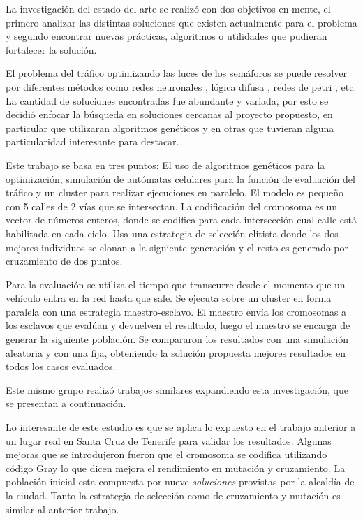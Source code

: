 La investigación del estado del arte se realizó con dos objetivos en mente, el primero analizar las distintas soluciones que existen actualmente para el problema y segundo encontrar nuevas prácticas, algoritmos o utilidades que pudieran fortalecer la solución.

El problema del tráfico optimizando las luces de los semáforos se puede resolver por diferentes métodos como  redes neuronales \citep{Lopez1999}, lógica difusa \citep{Lim2001}, redes de petri \citep{DiFebbraro2002}, etc. La cantidad de soluciones encontradas fue abundante y variada, por esto se decidió enfocar la búsqueda en soluciones cercanas al proyecto propuesto, en particular que utilizaran algoritmos genéticos y en otras que tuvieran alguna particularidad interesante para destacar.


\begin{itemize}
\begin{item}

Este trabajo se basa en tres puntos: El uso de algoritmos genéticos para la optimización, simulación de autómatas celulares para la función de evaluación del tráfico y un cluster para realizar ejecuciones en paralelo.
El modelo es pequeño con 5 calles de 2 vías que se intersectan.
La codificación del cromosoma es un vector de números enteros, donde se codifica para cada intersección cual calle está habilitada en cada ciclo.
Usa una estrategia de selección elitista donde los dos mejores individuos se clonan a la siguiente generación y el resto es generado por cruzamiento de dos puntos.

Para la evaluación se utiliza el tiempo que transcurre desde el momento que un vehículo entra en la red hasta que sale. Se ejecuta sobre un cluster en forma paralela con una estrategia maestro-esclavo. El maestro envía los cromosomas a los esclavos que evalúan y devuelven el resultado, luego el maestro se encarga de generar la siguiente población.
Se compararon los resultados con una simulación aleatoria y con una fija, obteniendo la solución propuesta mejores resultados en todos los casos evaluados.
	
Este mismo grupo realizó trabajos similares expandiendo esta investigación, que se presentan a continuación.
\end{item}
	
\begin{item}
Lo interesante de este estudio es que se aplica lo expuesto en el trabajo anterior a un lugar real en Santa Cruz de Tenerife para validar los resultados.
Algunas mejoras que se introdujeron fueron que el cromosoma se codifica utilizando código Gray lo que dicen mejora el rendimiento en mutación y cruzamiento. La población inicial esta compuesta por nueve \emph{soluciones} provistas por la alcaldía de la ciudad. Tanto la estrategia de selección como de cruzamiento y mutación es similar al anterior trabajo.


\end{item}
\end{itemize}
